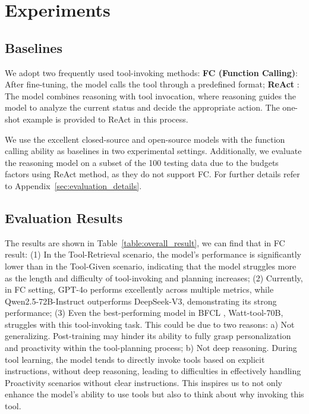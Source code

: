 \documentclass[11pt]{article}
\begin{document}
\section{Experiments}
\subsection{Baselines}
We adopt two frequently used tool-invoking methods: \textbf{FC (Function Calling)}: After fine-tuning, the model calls the tool through a predefined format; \textbf{ReAct} \cite{yao2023react}: The model combines reasoning with tool invocation, where reasoning guides the model to analyze the current status and decide the appropriate action. The one-shot example is provided to ReAct in this process. 





We use the excellent closed-source and open-source models with the function calling ability as baselines in two experimental settings. 
Additionally, we evaluate the reasoning model on a subset of the 100 testing data due to the budgets factors using ReAct method, as they do not support FC. For further details refer to Appendix~\ref{sec:evaluation_details}.




\subsection{Evaluation Results}
The results are shown in Table~\ref{table:overall_result}, we can find that in FC result: (1) In the Tool-Retrieval scenario, the model's performance is significantly lower than in the Tool-Given scenario, indicating that the model struggles more as the length and difficulty of tool-invoking and planning increases; (2) Currently, in FC setting, GPT-4o performs excellently across multiple metrics, while Qwen2.5-72B-Instruct outperforms DeepSeek-V3, demonstrating its strong performance; (3) Even the best-performing model in BFCL \cite{berkeley-function-calling-leaderboard}, Watt-tool-70B, struggles with this tool-invoking task. This could be due to two reasons: a) Not generalizing. Post-training may hinder its ability to fully grasp personalization and proactivity within the tool-planning process; b) Not deep reasoning. During tool learning, the model tends to directly invoke tools based on explicit instructions, without deep reasoning, leading to difficulties in effectively handling Proactivity scenarios without clear instructions. This inspires us to not only enhance the model's ability to use tools but also to think about why invoking this tool.
\end{document}

